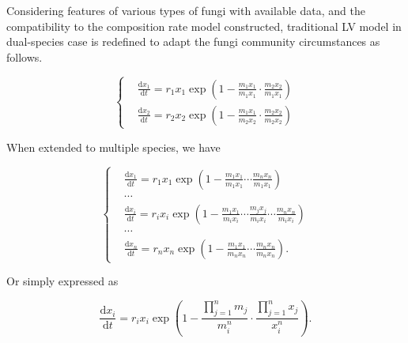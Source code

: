Considering features of various types of fungi with available data, and the compatibility to the composition rate model constructed, traditional LV model in dual-species case is redefined to adapt the fungi community circumstances as follows.

\begin{equation}
    \left\{\begin{aligned}         &
        \frac{\mathrm{d}x_1}{\mathrm{d}t} =
        r_1x_1\exp\left(
        1 - \frac{m_1x_1}{m_1x_1}\cdot
        \frac{m_2x_2}{m_1x_1}
        \right) \\ &
        \frac{\mathrm{d}x_2}{\mathrm{d}t} =
        r_2x_2\exp\left(
        1 - \frac{m_1x_1}{m_2x_2}\cdot
        \frac{m_2x_2}{m_2x_2}
        \right)
    \end{aligned}\right.
\end{equation}

When extended to multiple species, we have

\begin{equation}
    \left\{\begin{aligned}         &
        \frac{\mathrm{d}x_1}{\mathrm{d}t} =
        r_1x_1\exp\left(
            1 - \frac{m_1x_1}{m_1x_1}\cdots
            \frac{m_nx_n}{m_1x_1}
        \right) \\ & \cdots \\ &
        \frac{\mathrm{d}x_i}{\mathrm{d}t} =
        r_ix_i\exp\left(
            1 - \frac{m_1x_1}{m_ix_i}\cdots
            \frac{m_jx_j}{m_ix_i}\cdots
            \frac{m_nx_n}{m_ix_i}
        \right) \\ & \cdots \\ &
        \frac{\mathrm{d}x_n}{\mathrm{d}t} =
        r_nx_n\exp\left(
            1 - \frac{m_1x_1}{m_nx_n}\cdots
            \frac{m_nx_n}{m_nx_n}
        \right).
    \end{aligned}\right.
\end{equation}

Or simply expressed as

\begin{equation}\label{eq:LV-adapt}
    \frac{\mathrm{d}x_i}{\mathrm{d}t} =
    r_ix_i\exp\left(
            1 - \frac{\prod_{j=1}^n m_j}{m_i^n}\cdot
            \frac{\prod_{j=1}^n x_j}{x_i^n}
        \right).
\end{equation}


